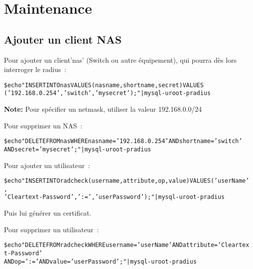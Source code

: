 \section{Maintenance}

\subsection{Ajouter un client NAS}

Pour ajouter un client'nas' (Switch ou autre équipement), qui pourra dès lors interroger le radius~:

\begin{alltt}
\$ echo "INSERT INTO nas VALUES (nasname, shortname, secret) VALUES \\('192.168.0.254','switch','mysecret');" | mysql -uroot -p radius
\end{alltt}

\textbf{Note:} Pour spécifier un netmask, utiliser la valeur 192.168.0.0/24

Pour supprimer un NAS~:
\begin{alltt}
\$ echo "DELETE FROM nas WHERE nasname='192.168.0.254' AND shortname='switch' \\AND secret='mysecret';" | mysql -uroot -p radius
\end{alltt}


Pour ajouter un utilisateur~:
\begin{alltt}
\$ echo "INSERT INTO radcheck(username,attribute,op,value) VALUES ('userName',\\'Cleartext-Password',':=','userPassword');" | mysql -uroot -p radius
\end{alltt}
Puis lui générer un certificat.

Pour supprimer un utilisateur~:
\begin{alltt}
\$ echo "DELETE FROM radcheck WHERE username='userName' AND attribute='Cleartext-Password'\\ AND op=':=' AND value='userPassword';" | mysql -uroot -p radius
\end{alltt}

